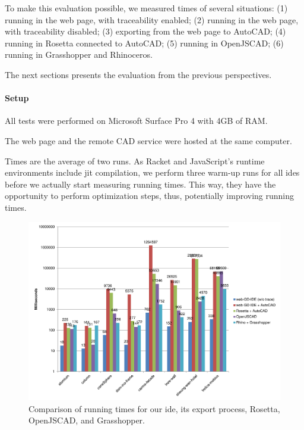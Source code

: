 To make this evaluation possible, we measured times of several situations:
(1) running in the web page, with traceability enabled;
(2) running in the web page, with traceability disabled;
(3) exporting from the web page to AutoCAD;
(4) running in Rosetta connected to AutoCAD;
(5) running in OpenJSCAD;
(6) running in Grasshopper and Rhinoceros.

The next sections presents the evaluation from the previous perspectives.

\paragraph{Setup}
All tests were performed on Microsoft Surface Pro 4 with 4GB of RAM.

The web page and the remote CAD service were hosted at the same computer.

Times are the average of two runs.
As Racket and JavaScript's runtime environments include \gls{jit} compilation, we perform three warm-up runs for all \glspl{ide} before we actually start measuring running times.
This way, they have the opportunity to perform optimization steps, thus, potentially improving running times.


\begin{figure}
  \centering
  \includegraphics[width=1.0\textwidth]{./images/run_export_rosetta_times}
  \caption{Comparison of running times for our \gls{ide}, its export process, Rosetta, OpenJSCAD, and Grasshopper.}
  \label{fig:run:export:rosetta:chart}
\end{figure}


